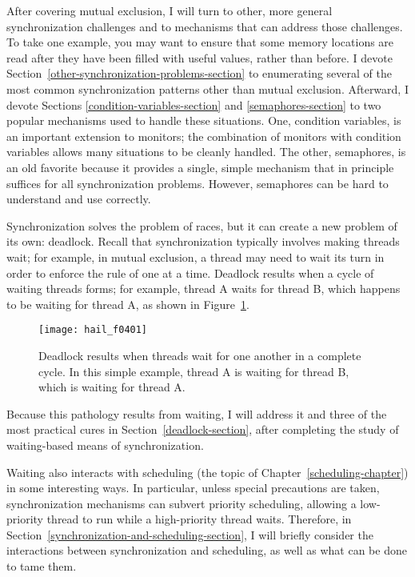After covering mutual exclusion, I will turn to other, more general
synchronization challenges and to mechanisms that can address those
challenges.  To take one example, you may want to ensure that some
memory locations are read after they have been filled with useful
values, rather than before.  I devote Section~\ref{other-synchronization-problems-section} to enumerating
several of the most common synchronization patterns other than mutual
exclusion.  Afterward, I devote
Sections \ref{condition-variables-section} and \ref{semaphores-section} to two popular
mechanisms used to handle these situations. One, condition variables,
is an important extension to monitors; the combination of monitors
with condition variables allows many situations to be cleanly handled.
The other, semaphores, is an old favorite because it provides a
single, simple mechanism that in principle suffices for all
synchronization problems.  However, semaphores can be hard to
understand and use correctly.

Synchronization solves the problem of races, but it can create a new
problem of its own: deadlock.  Recall that synchronization typically
involves making threads wait; for example, in mutual exclusion, a
thread may need to wait its turn in order to enforce the rule of one
at a time.  Deadlock results when a cycle of waiting threads forms;
for example, thread A waits for thread B, which happens to be waiting
for thread A, as shown in Figure~\ref{scan-4-2}.
\begin{figure}
\centerline{\texttt{[image: hail\_f0401]}}
\caption{Deadlock results when threads wait for one another in a
  complete cycle.  In this simple example, thread A is waiting for
  thread B, which is waiting for thread A.}
\label{scan-4-2}
\end{figure}
Because this pathology results from waiting, I
will address it and three of the most practical cures in Section~\ref{deadlock-section}, after
completing the study of waiting-based means of synchronization.

Waiting also interacts with scheduling (the topic of
Chapter~\ref{scheduling-chapter}) in some interesting ways.  In particular, unless special
precautions are taken, synchronization mechanisms can subvert priority
scheduling, allowing a low-priority thread to run while a
high-priority thread waits.  Therefore, in
Section~\ref{synchronization-and-scheduling-section}, I will briefly consider the
interactions between synchronization and scheduling, as well as what can be
done to tame them.

